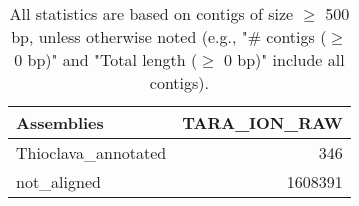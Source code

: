 \documentclass[12pt,a4paper]{article}
\begin{document}
\begin{table}[ht]
\begin{center}
\caption{All statistics are based on contigs of size $\geq$ 500 bp, unless otherwise noted (e.g., "\# contigs ($\geq$ 0 bp)" and "Total length ($\geq$ 0 bp)" include all contigs).}
\begin{tabular}{|l*{1}{|r}|}
\hline
Assemblies & TARA\_ION\_RAW \\ \hline
Thioclava\_annotated & 346 \\ \hline
not\_aligned & 1608391 \\ \hline
\end{tabular}
\end{center}
\end{table}
\end{document}

